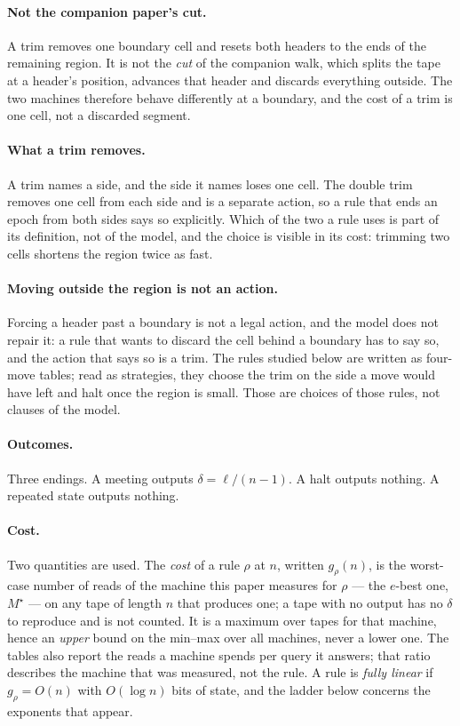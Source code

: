 \documentclass[11pt]{article}
\theoremstyle{remark}
\begin{document}
\paragraph{Not the companion paper's cut.} A trim removes one boundary cell and resets both
headers to the ends of the remaining region. It is not the \emph{cut} of the companion walk,
which splits the tape at a header's position, advances that header and discards everything
outside. The two machines therefore behave differently at a boundary, and the cost of a trim is
one cell, not a discarded segment.

\paragraph{What a trim removes.} A trim names a side, and the side it names loses one cell. The
double trim removes one cell from each side and is a separate action, so a rule that ends an epoch
from both sides says so explicitly. Which of the two a rule uses is part of its definition, not of
the model, and the choice is visible in its cost: trimming two cells shortens the region twice as
fast.

\paragraph{Moving outside the region is not an action.} Forcing a header past a boundary is not a
legal action, and the model does not repair it: a rule that wants to discard the cell behind a
boundary has to say so, and the action that says so is a trim. The rules studied below are written as
four-move tables; read as strategies, they choose the trim on the side a move would have left and halt
once the region is small. Those are choices of those rules, not clauses of the model.

\paragraph{Outcomes.} Three endings. A meeting outputs $\delta=\ell/(n-1)$. A halt outputs nothing. A
repeated state outputs nothing.

\paragraph{Cost.} Two quantities are used. The \emph{cost} of a rule $\rho$ at $n$, written
$g_{\rho}(n)$, is the worst-case number of reads of the machine this paper measures for $\rho$ ---
the $e$-best one, $M^{\star}$ --- on any tape of length $n$ that produces one; a tape with no output
has no $\delta$ to reproduce and is not counted. It is a maximum over tapes for that machine, hence an
\emph{upper} bound on the min--max over all machines, never a lower one. The tables also report the reads a machine spends per query it answers; that ratio
describes the machine that was measured, not the rule. A rule is \emph{fully linear} if
$g_{\rho}=O(n)$ with $O(\log n)$ bits of state, and the ladder below
concerns the exponents that appear.
\end{document}
